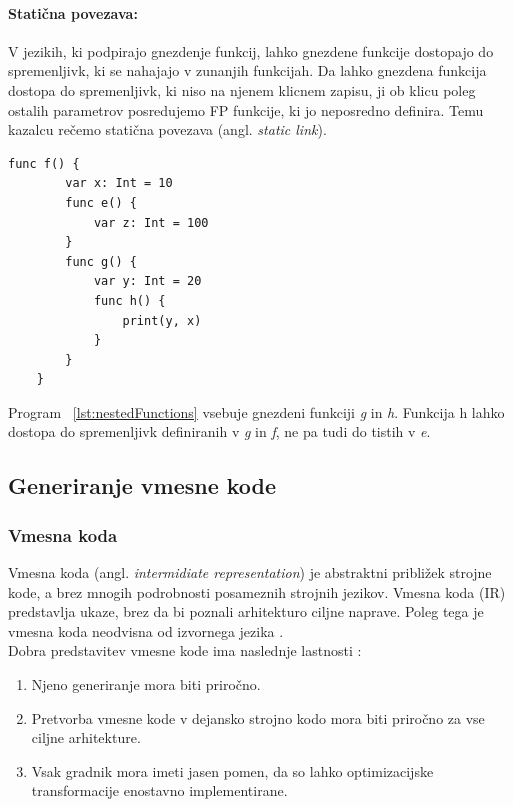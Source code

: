 \documentclass[a4paper, 12p]{book}
\begin{document}
\paragraph{Statična povezava:}

V jezikih, ki podpirajo gnezdenje funkcij, lahko gnezdene funkcije dostopajo do spremenljivk, ki se nahajajo v zunanjih funkcijah. Da lahko gnezdena funkcija dostopa do spremenljivk, ki niso na njenem klicnem zapisu, ji ob klicu poleg ostalih parametrov posredujemo FP funkcije, ki jo neposredno definira. Temu kazalcu rečemo statična povezava (angl. \textit{static link}). 

\renewcommand{\lstlistingname}{Program}
\begin{lstlisting}[caption={Primer gnezdenih funkcij.}, captionpos=b, label={lst:nestedFunctions}]
    func f() {
        var x: Int = 10
        func e() {
            var z: Int = 100
        }
        func g() {
            var y: Int = 20
            func h() {
                print(y, x)
            }
        }
    }
\end{lstlisting}

Program ~\ref{lst:nestedFunctions} vsebuje gnezdeni funkciji \textit{g} in \textit{h}. Funkcija h lahko dostopa do spremenljivk definiranih v \textit{g} in \textit{f}, ne pa tudi do tistih v \textit{e}.

\subsection{Generiranje vmesne kode}   

\subsubsection{Vmesna koda}

Vmesna koda (angl. \textit{intermidiate representation}) je abstraktni približek strojne kode, a brez mnogih podrobnosti posameznih strojnih jezikov. Vmesna koda (IR) predstavlja ukaze, brez da bi poznali arhitekturo ciljne naprave. Poleg tega je vmesna koda neodvisna od izvornega jezika \cite{modernCompiler}. \\
\indent Dobra predstavitev vmesne kode ima naslednje lastnosti \cite{modernCompiler}:

\begin{enumerate}
	\item Njeno generiranje mora biti priročno.
	\item Pretvorba vmesne kode v dejansko strojno kodo mora biti priročno za vse ciljne arhitekture.
	\item Vsak gradnik mora imeti jasen pomen, da so lahko optimizacijske transformacije enostavno implementirane.
\end{enumerate}
\end{document}
